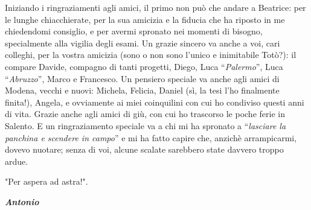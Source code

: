 Iniziando i ringraziamenti agli amici, il primo non può che andare a Beatrice: per le lunghe chiacchierate, per la sua amicizia e la fiducia che ha riposto in me chiedendomi consiglio, e per avermi spronato nei momenti di bisogno, specialmente alla vigilia degli esami. Un grazie sincero va anche a voi, cari colleghi, per la vostra amicizia (sono o non sono l'unico e inimitabile Totò?): il compare Davide, compagno di tanti progetti, Diego, Luca “\textit{Palermo}”, Luca “\textit{Abruzzo}”, Marco e Francesco. Un pensiero speciale va anche agli amici di Modena, vecchi e nuovi: Michela, Felicia, Daniel (sì, la tesi l'ho finalmente finita!), Angela, e ovviamente ai miei coinquilini con cui ho condiviso questi anni di vita. Grazie anche agli amici di giù, con cui ho trascorso le poche ferie in Salento. E un ringraziamento speciale va a chi mi ha spronato a “\textit{lasciare la panchina e scendere in campo}” e mi ha fatto capire che, anzichè arrampicarmi, dovevo nuotare; senza di voi, alcune scalate sarebbero state davvero troppo ardue.

\noindent "Per aspera ad astra!".

\begin{flushright}
    \textbf{\textit{Antonio}}
\end{flushright}